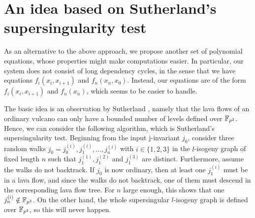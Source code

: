 \section{An idea based on Sutherland's supersingularity test}
As an alternative to the above approach, we propose another set of polynomial equations, whose properties might make computations easier.
In particular, our system does not consist of long dependency cycles, in the sense that we have equations $f_i(x_i, x_{i + 1})$ and $f_n(x_n, x_0)$.
Instead, our equations are of the form $f_i(x_i, x_{i + 1})$ and $f_n(x_n)$, which seems to be easier to handle.

The basic idea is an observation by Sutherland \cite{sutherland_supersingularity_test}, namely that the lava flows of an ordinary vulcano can only have a bounded number of levels defined over $\mathbb{F}_{p^2}$.
Hence, we can consider the following algorithm, which is Sutherland's supersingularity test.
Beginning from the input j-invariant $j_0$, consider three random walks $j_0 = j_0^{(i)}, j_1^{(i)}, ..., j_n^{(i)}$ with $i \in \{ 1, 2, 3 \}$ in the $l$-isogeny graph of fixed length $n$ such that $j_1^{(1)}, j_1^{(2)}$ and $j_1^{(3)}$ are distinct.
Furthermore, assume the walks do not backtrack.
If $j_0$ is now ordinary, then at least one $j_1^{(i)}$ must be in a lava flow, and since the walks do not backtrack, one of them must descend in the corresponding lava flow tree.
For $n$ large enough, this shows that one $j_n^{(i)} \notin \mathbb{F}_{p^2}$.
On the other hand, the whole supersingular $l$-isogeny graph is defined over $\mathbb{F}_{p^2}$, so this will never happen.


